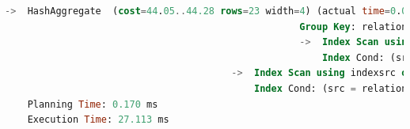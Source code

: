 \begin{lstlisting}[language=SQL,caption = Ausführungsplan verschachteltes SELECT,frame=single, label={AusführungsplanCascadeSELECT} ]
                                                    ->  HashAggregate  (cost=44.05..44.28 rows=23 width=4) (actual time=0.018..0.021 rows=27 loops=1)
                                                    Group Key: relation_facebook_4.dst
                                                    ->  Index Scan using indexsrc on relation_facebook relation_facebook_4  (cost=0.29..44.00 rows=23 width=4) (actual time=0.009..0.012 rows=27 loops=1)
                                                        Index Cond: (src = 765)
                                        ->  Index Scan using indexsrc on relation_facebook relation_facebook_3  (cost=0.29..34.96 rows=27 width=8) (actual time=0.002..0.005 rows=23 loops=27)
                                            Index Cond: (src = relation_facebook_4.dst)
    Planning Time: 0.170 ms
    Execution Time: 27.113 ms


\end{lstlisting}

